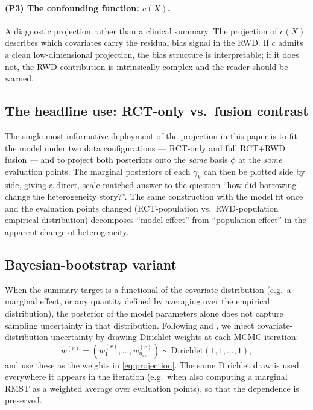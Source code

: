 \documentclass[11pt]{article}
\theoremstyle{plain}
\theoremstyle{definition}
\theoremstyle{remark}
\newcommand{\1}{\mathds{1}}
\newcommand{\X}{X}
\newcommand{\cf}{c}
\begin{document}
\paragraph{(P3) The confounding function: $\cf(\X)$.}
A diagnostic projection rather than a clinical summary. The projection of
$\cf(\X)$ describes which covariates carry the residual bias signal in the
RWD. If $\cf$ admits a clean low-dimensional projection, the bias structure
is interpretable; if it does not, the RWD contribution is intrinsically
complex and the reader should be warned.

\subsection{The headline use: RCT-only vs.\ fusion contrast}

The single most informative deployment of the projection in this paper is
to fit the model under two data configurations --- RCT-only and full
RCT$+$RWD fusion --- and to project both posteriors onto the \emph{same}
basis $\phi$ at the \emph{same} evaluation points. The marginal posteriors
of each $\gamma_{k}$ can then be plotted side by side, giving a direct,
scale-matched answer to the question ``how did borrowing change the
heterogeneity story?''. The same construction with the model fit once and
the evaluation points changed (RCT-population vs.\ RWD-population
empirical distribution) decomposes ``model effect'' from
``population effect'' in the apparent change of heterogeneity.

\subsection{Bayesian-bootstrap variant}

When the summary target is a functional of the covariate distribution
(e.g.\ a marginal effect, or any quantity defined by averaging over the
empirical distribution), the posterior of the model parameters alone does
not capture sampling uncertainty in that distribution. Following
\citet{Rubin1981} and \citet{Antonelli2019}, we inject covariate-distribution
uncertainty by drawing Dirichlet weights at each MCMC iteration:
\begin{equation}
  w^{(r)} = (w_{1}^{(r)}, \ldots, w_{n_{\mathrm{ev}}}^{(r)}) \sim
  \mathrm{Dirichlet}(1, 1, \ldots, 1),
  \label{eq:bb}
\end{equation}
and use these as the weights in \eqref{eq:projection}. The same Dirichlet
draw is used everywhere it appears in the iteration (e.g.\ when also
computing a marginal RMST as a weighted average over evaluation points),
so that the dependence is preserved.
\end{document}

